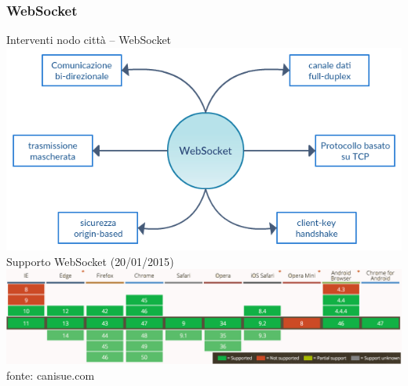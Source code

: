 \subsubsection{WebSocket}
\begin{frame}{Interventi nodo città -- \scriptsize{WebSocket}}
	\only<1>
	{
		\centering
		\includegraphics[scale=0.5]{images/websocketCharacteristics.png}
	}
	\only<2>
	{
		Supporto WebSocket (\scriptsize{20/01/2015}\normalsize{)}
		\centering
		\includegraphics[scale=0.25]{images/websocketSupport.png}
		\\
		\vspace{10mm}
		\tiny{fonte: canisue.com}
	}
\end{frame}

